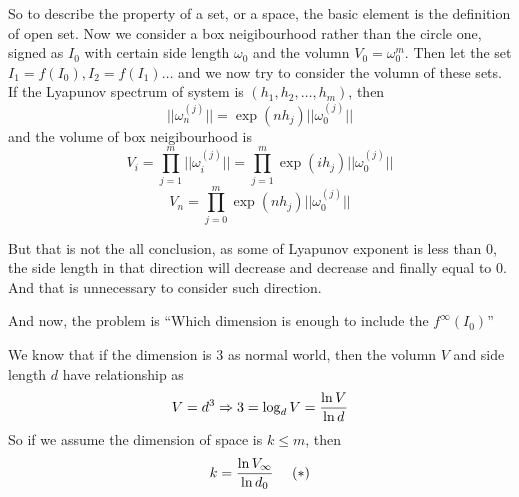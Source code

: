 \documentclass[12pt]{article}
\theoremstyle{plain}
\begin{document}
So to describe the property of a set, or a space, the basic element is the definition of open set. Now we consider a box neigibourhood rather than the circle one, signed as $I_0$ with certain side length $\omega_0$ and the volumn $V_0 = \omega_0^m$. Then let the set $I_1 = f(I_0), I_2 = f(I_1) \ldots$ and we now try to consider the volumn of these sets. If the Lyapunov spectrum of system is $(h_1, h_2, \ldots, h_m)$, then
$$
||\omega_n^{(j)}|| = \exp(nh_j)||\omega_0^{(j)}||
$$
and the volume of box neigibourhood is 
$$
V_i= \prod_{j = 1}^{m}||\omega_i^{(j)}|| = \prod_{j = 1}^{m}\exp(ih_j)||\omega_0^{(j)}||
$$
$$
V_n = \prod_{j = 0}^{m}\exp(nh_j)||\omega_0^{(j)}||
$$

But that is not the all conclusion, as some of Lyapunov exponent is less than 0, the side length in that direction will decrease and decrease and finally equal to 0. And that is unnecessary to consider such direction.

And now, the problem is ``Which dimension is enough to include the $f^\infty(I_0)$''

We know that if the dimension is $3$ as normal world, then the volumn $V$ and side length $d$ have relationship as 
$$
V = d^3 \Rightarrow 3 = \log_d V = {\ln V \over \ln d}
$$
So if we assume the dimension of space is $k \leq m$, then 
$$
k = {\ln V_\infty \over \ln d_0} \ \ \ \ (*)
$$
\end{document}
